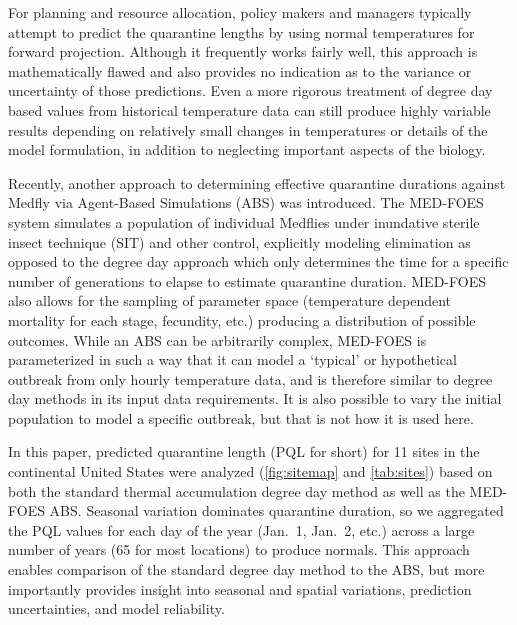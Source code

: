 \documentclass[10pt,a4paper,twocolumn]{article}
\begin{document}
For planning and resource allocation, policy makers and managers 
typically attempt to predict the quarantine lengths by using
normal temperatures for forward projection.  %
Although it frequently works fairly well,
this approach is mathematically flawed 
and also provides no indication as to the variance or uncertainty
of those predictions.
Even a more rigorous treatment of degree day based values from
historical temperature data can still produce highly variable results
depending on relatively small changes in temperatures or details of
the model formulation\cite{Roltsch1999}, in addition to neglecting
important aspects of the biology.

Recently, another approach to determining effective quarantine 
durations against Medfly via Agent-Based Simulations (ABS)\cite{manoukis_agent-based_2014}
was introduced. 
The MED-FOES system simulates a population of individual Medflies 
under inundative sterile insect technique (SIT) and other control, 
explicitly modeling elimination as opposed to the degree day 
approach which only determines the time for a specific
number of generations to elapse to estimate quarantine duration.
MED-FOES also allows for the sampling of parameter space
(temperature dependent mortality for each stage, fecundity, etc.)
producing a distribution of possible outcomes.
While an ABS can be arbitrarily complex, MED-FOES is parameterized
in such a way that it can model a `typical' or hypothetical outbreak from only hourly temperature data,
and is therefore similar to degree day methods in its input data requirements.
It is also possible to vary the initial population to model a specific outbreak, but
that is not how it is used here.

In this paper, predicted quarantine length (PQL for short) 
for 11 sites in the continental United States were analyzed
(\autoref{fig:sitemap} and \autoref{tab:sites})
based on both the standard thermal accumulation degree day method\cite{ECY:ECY1969503514} 
as well as the MED-FOES ABS\cite{manoukis_computer_2014}. 
Seasonal variation dominates quarantine duration, 
so we aggregated the PQL values for each day of the year 
(Jan.\ 1, Jan.\ 2, etc.) 
across a large number of years (65 for most locations) to produce normals.
This approach enables comparison of the standard degree day 
method to the ABS, but more importantly provides insight 
into seasonal and spatial variations, prediction uncertainties, 
and model reliability.
\end{document}
